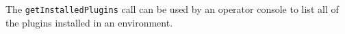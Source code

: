 The \verb+getInstalledPlugins+ call can be used by an operator console to list
all of the plugins installed in an environment.
